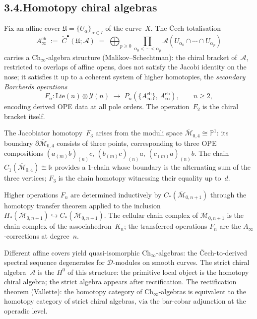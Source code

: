 \documentclass[11pt]{report}
\theoremstyle{definition}
\theoremstyle{remark}
\providecommand{\cA}{\mathcal{A}}
\providecommand{\cY}{\mathcal{Y}}
\providecommand{\Bbbk}{\mathbb{k}}
\numberwithin{equation}{section}
\begin{document}
\subsection*{3.4.\enspace Homotopy chiral algebras}

Fix an affine cover $\mathfrak U=\{U_\alpha\}_{\alpha\in I}$ of the
curve~$X$. The \v{C}ech totalisation
\[
A^{\mathrm{ch}}_\infty
\;:=\;
\check C^\bullet(\mathfrak U;\cA)
\;=\;
\bigoplus_{p\ge 0}
\prod_{\alpha_0<\cdots<\alpha_p}
\cA(U_{\alpha_0}\cap\cdots\cap U_{\alpha_p})
\]
carries a $\mathrm{Ch}_\infty$-algebra structure
(Malikov--Schechtman): the chiral bracket of~$\cA$, restricted to
overlaps of affine opens, does not satisfy the Jacobi identity on
the nose; it satisfies it up to a coherent system of higher
homotopies, the \emph{secondary Borcherds operations}
\[
F_n\colon\mathrm{Lie}(n)\otimes\cY(n)
\;\longrightarrow\;
P_n(\{A^{\mathrm{ch}}_\infty\},\,A^{\mathrm{ch}}_\infty),
\qquad n\ge 2,
\]
encoding derived OPE data at all pole orders. The operation~$F_2$
is the chiral bracket itself.

The Jacobiator homotopy~$F_3$ arises from the moduli space
$\overline{\mathcal M}_{0,4}\cong\mathbb P^1$: its boundary
$\partial\overline{\mathcal M}_{0,4}$ consists of three points,
corresponding to three OPE compositions
$(a_{(m)}b)_{(n)}c$, $(b_{(m)}c)_{(n)}a$,
$(c_{(m)}a)_{(n)}b$. The chain
$C_1(\overline{\mathcal M}_{0,4})\cong\Bbbk$ provides a
$1$-chain whose boundary is the alternating sum of the three
vertices; $F_3$ is the chain homotopy witnessing their equality
up to~$d$.

Higher operations $F_n$ are determined inductively by
$C_*(\overline{\mathcal M}_{0,n+1})$ through the homotopy transfer
theorem applied to the inclusion
$H_*(\overline{\mathcal M}_{0,n+1})
\hookrightarrow
C_*(\overline{\mathcal M}_{0,n+1})$.
The cellular chain complex of $\overline{\mathcal M}_{0,n+1}$ is
the chain complex of the associahedron~$K_n$; the transferred
operations $F_n$ are the $A_\infty$-corrections at degree~$n$.

Different affine covers yield quasi-isomorphic
$\mathrm{Ch}_\infty$-algebras: the \v{C}ech-to-derived spectral
sequence degenerates for $\mathcal D$-modules on smooth curves.
The strict chiral algebra~$\cA$ is the $H^0$ of this structure: the
primitive local object is the homotopy chiral algebra; the strict
algebra appears after rectification. The rectification theorem
(Vallette): the homotopy category of $\mathrm{Ch}_\infty$-algebras
is equivalent to the homotopy category of strict chiral algebras,
via the bar-cobar adjunction at the operadic level.
\end{document}
